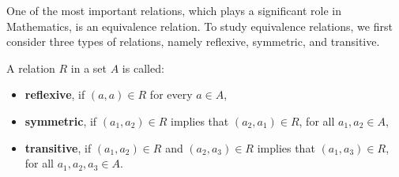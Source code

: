 \documentclass[12pt]{article}
\begin{document}
One of the most important relations, which plays a significant role in Mathematics, is an equivalence relation. To study equivalence relations, we first consider three types of relations, namely reflexive, symmetric, and transitive.

\begin{definition}
A relation \( R \) in a set \( A \) is called:
\begin{itemize}
    \item \textbf{reflexive}, if \( (a, a) \in R \) for every \( a \in A \),
    \item \textbf{symmetric}, if \( (a_1, a_2) \in R \) implies that \( (a_2, a_1) \in R \), for all \( a_1, a_2 \in A \),
    \item \textbf{transitive}, if \( (a_1, a_2) \in R \) and \( (a_2, a_3) \in R \) implies that \( (a_1, a_3) \in R \), for all \( a_1, a_2, a_3 \in A \).
\end{itemize}
\end{definition}
\end{document}
